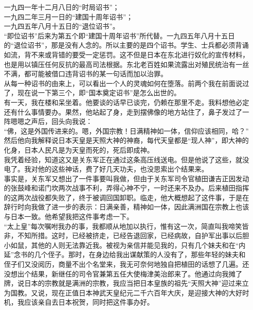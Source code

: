 一九四一年十二月八日的“时局诏书”；\\

一九四二年三月一日的“建国十周年诏书”；\\

一九四五年八月十五日的“退位诏书”。\\

“即位诏书”后来为第五个即“建国十周年诏书”所代替。一九四五年八月十五日的“退位诏书”，那是没有人念的。所以主要的是四个诏书。学生、士兵都必须背诵如流，背不来或背错的要受一定惩罚。这不但是日本在东北进行奴化的宣传材料，也是用以镇压任何反抗的最高司法根据。东北老百姓如果流露出对殖民统治有一丝不满，都可能被借口违背诏书的某一句话而加以治罪。\\

从每一种诏书的由来上，可以看出一个人的灵魂如何在堕落。前两个我在前面说过了，现在说一下第三个，即“国本奠定诏书”是怎么出世的。\\

有一天，我在楼和呆坐着。他要谈的话早已谈完，仍赖在那里不走。我料想他必定还有什么事情要办。果然，他站起了身，走到摆佛像的地方站住了，鼻子发过了一阵嗯嗯之声后，回头向我说：\\

“佛，这是外国传进来的。嗯，外国宗教！日满精神如一体，信仰应该相同，哈？”\\

然后他向我解释说日本天皇是天照大神的神裔，每代天皇都是“现人神”，即大神的化身，日本人民凡是为天皇而死的，死后即成神。\\

我凭着经验，知道这又是关东军正在通过这条高压线送电。但是他说了这些，就没电了。我对他的这些神话，费了好几天功夫，也没思索出个结果来。\\

事实是，关东军又想出了一件事要叫我做，但由于关东军司令官植田谦吉正因发动的张鼓峰和诺门坎两次战事不利，弄得心神不宁，一时还来不及办。后来植田指挥的这两次战役都失败了，终于被调回国卸职。临走，他大概想起了这件事，于是在辞行时向我做了进一步的表示：日满亲善，精神如一体，因此满洲国在宗教上也该与日本一致。他希望我把这件事考虑一下。\\

“太上皇”每次嘱咐我办的事，我都顺从地加以执行，惟有这一次，简直叫我啼笑皆非，不知所措。这时，已经被挤走，已经告退回家，已经病故，自护军出事以后胆小如鼠，其他的人则无法靠近我。被视为亲信并能见我的，只有几个妹夫和在“内延”念书的几个侄子。那时，在身边给我出谋献策的人没有了，那些年轻的妹夫和侄子们又没阅历，商量不出个名堂来，我无可奈何地独自把植田的话想了几遍。还没想出个结果，新继任的司令官兼第五任大使梅津美治郎来了。他通过向我摊了牌，说日本的宗教就是满洲的宗教，我应当把日本皇族的祖先“天照大神”迎过来立为国教。又说，现在正值日本神武天皇纪元二千六百年大庆，是迎接大神的大好时机，我应该亲自去日本祝贺，同时把这件事办好。\\

